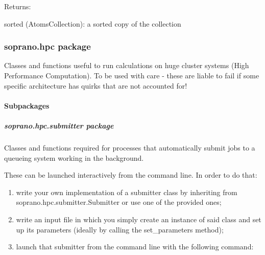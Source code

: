 \documentclass[letterpaper,10pt,english]{sphinxmanual}
\begin{document}
\begin{fulllineitems}
\begin{fulllineitems}
\begin{DUlineblock}{0em}
\item[] Returns:
\item[]
\begin{DUlineblock}{\DUlineblockindent}
\item[] sorted (AtomsCollection): a sorted copy of the collection
\end{DUlineblock}
\end{DUlineblock}

\end{fulllineitems}


\end{fulllineitems}



\subsubsection{soprano.hpc package}
\label{doctree/soprano.hpc:module-soprano.hpc}\label{doctree/soprano.hpc:soprano-hpc-package}\label{doctree/soprano.hpc::doc}
Classes and functions useful to run calculations on huge cluster systems
(High Performance Computation). To be used with care - these are liable to
fail if some specific architecture has quirks that are not accounted for!


\paragraph{Subpackages}
\label{doctree/soprano.hpc:subpackages}

\subparagraph{soprano.hpc.submitter package}
\label{doctree/soprano.hpc.submitter:soprano-hpc-submitter-package}\label{doctree/soprano.hpc.submitter::doc}\label{doctree/soprano.hpc.submitter:module-soprano.hpc.submitter}
Classes and functions required for processes that automatically submit jobs
to a queueing system working in the background.

These can be launched interactively from the command line. In order to do
that:
\begin{enumerate}
\item {} 
write your own implementation of a submitter class by inheriting from
soprano.hpc.submitter.Submitter or use one of the provided ones;

\item {} 
write an input file in which you simply create an instance of said class
and set up its parameters (ideally by calling the set\_parameters method);

\item {} 
launch that submitter from the command line with the following command:
\begin{quote}

\end{quote}

\end{enumerate}
\end{document}
